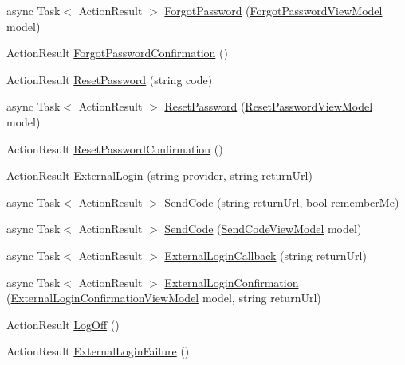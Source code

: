 \begin{DoxyCompactItemize}
\item 
async Task$<$ Action\+Result $>$ \hyperlink{class_bibabook_1_1_controllers_1_1_account_controller_a15b6e7261c3ae2d06e2af37ca22cbb78}{Forgot\+Password} (\hyperlink{class_bibabook_1_1_models_1_1_forgot_password_view_model}{Forgot\+Password\+View\+Model} model)
\item 
Action\+Result \hyperlink{class_bibabook_1_1_controllers_1_1_account_controller_a56c894752c07df35e0bfdce011cc1777}{Forgot\+Password\+Confirmation} ()
\item 
Action\+Result \hyperlink{class_bibabook_1_1_controllers_1_1_account_controller_ab9f95d898f59c8b7c17ff0d0af2ff9a7}{Reset\+Password} (string code)
\item 
async Task$<$ Action\+Result $>$ \hyperlink{class_bibabook_1_1_controllers_1_1_account_controller_a6d12ebcda9b75057e8380e7a829e9065}{Reset\+Password} (\hyperlink{class_bibabook_1_1_models_1_1_reset_password_view_model}{Reset\+Password\+View\+Model} model)
\item 
Action\+Result \hyperlink{class_bibabook_1_1_controllers_1_1_account_controller_a9e3d1e98a6fe0eec9a209f3bd6db09e1}{Reset\+Password\+Confirmation} ()
\item 
Action\+Result \hyperlink{class_bibabook_1_1_controllers_1_1_account_controller_a40e010202f5ef39483a1cbd5118a7b11}{External\+Login} (string provider, string return\+Url)
\item 
async Task$<$ Action\+Result $>$ \hyperlink{class_bibabook_1_1_controllers_1_1_account_controller_af147abd204cedbaf0af04c99baae4e03}{Send\+Code} (string return\+Url, bool remember\+Me)
\item 
async Task$<$ Action\+Result $>$ \hyperlink{class_bibabook_1_1_controllers_1_1_account_controller_a2ff1a733c7015c75ebd643e252f87f06}{Send\+Code} (\hyperlink{class_bibabook_1_1_models_1_1_send_code_view_model}{Send\+Code\+View\+Model} model)
\item 
async Task$<$ Action\+Result $>$ \hyperlink{class_bibabook_1_1_controllers_1_1_account_controller_a5197a1d386b13d06ea145ce8bbb85423}{External\+Login\+Callback} (string return\+Url)
\item 
async Task$<$ Action\+Result $>$ \hyperlink{class_bibabook_1_1_controllers_1_1_account_controller_a85795f1b98396876cb43dd00e0038808}{External\+Login\+Confirmation} (\hyperlink{class_bibabook_1_1_models_1_1_external_login_confirmation_view_model}{External\+Login\+Confirmation\+View\+Model} model, string return\+Url)
\item 
Action\+Result \hyperlink{class_bibabook_1_1_controllers_1_1_account_controller_ad15c68dd2e6b54e70d2704de65d5e4f0}{Log\+Off} ()
\item 
Action\+Result \hyperlink{class_bibabook_1_1_controllers_1_1_account_controller_a8586c70c456a53036840a19408c0c193}{External\+Login\+Failure} ()
\end{DoxyCompactItemize}
